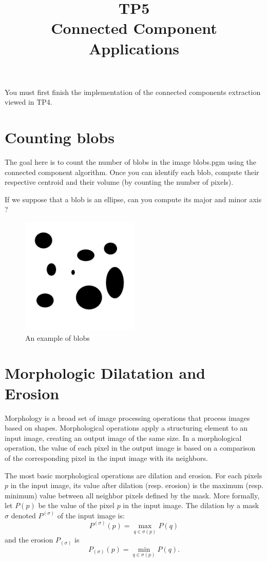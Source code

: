 \documentclass[a4paper, 11pt]{article}
\title{\bf{TP5 \\ Connected Component Applications}}
\author{}
\date{}
\begin{document}
\maketitle

You must first finish the implementation of the connected components extraction viewed in TP4.

\section*{\bf Counting blobs}

The goal here is to count the number of blobs in the image blobs.pgm using the connected component algorithm.
Once you can identify each blob, compute their respective centroid and their volume (by counting the number of pixels).

If we suppose that a blob is an ellipse, can you compute its major and minor axis ?

\begin{figure}
  \centering
  \includegraphics[width=0.5\textwidth]{blobs}
  \caption{An example of blobs}
\end{figure}

\section*{\bf Morphologic Dilatation and Erosion}

Morphology is a broad set of image processing operations that process images based on shapes. 
Morphological operations apply a structuring element to an input image, creating an output image of the same size. 
In a morphological operation, the value of each pixel in the output image is based on a comparison of the corresponding pixel in the input image with its neighbors. 

The most basic morphological operations are dilation and erosion. 
For each pixels $p$ in the input image, its value after dilation (resp. erosion) is the maximum (resp. minimum) value between all neighbor pixels defined by the mask.
More formally, let $P(p)$ be the value of the pixel $p$ in the input image. The dilation by a mask $\sigma$ denoted $P^{(\sigma)}$ of the input image is:
\[
  P^{(\sigma)}(p) = \max_{q\in\sigma(p)} P(q)
\]
and the erosion $P_{(\sigma)}$ is
\[
  P_{(\sigma)}(p) = \min_{q\in\sigma(p)} P(q).
\]
\end{document}
